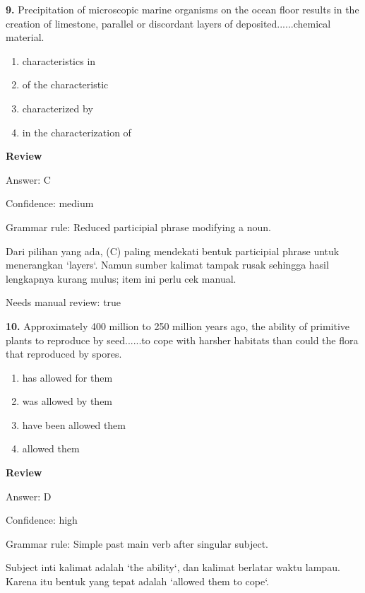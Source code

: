 \documentclass[12pt]{article}
\begin{document}
\noindent\textbf{9.} Precipitation of microscopic marine organisms on the ocean floor results in the creation of limestone, parallel or discordant layers of deposited......chemical material.
\begin{enumerate}[label=(\Alph*),leftmargin=*,itemsep=0.2em]
\item characteristics in
\item of the characteristic
\item characterized by
\item in the characterization of
\end{enumerate}
\par
\begingroup
\setlength{\parskip}{0pt}
\setlength{\parindent}{0pt}
\textbf{Review}\par
Answer: C\par
Confidence: medium\par
Grammar rule: Reduced participial phrase modifying a noun.\par
Dari pilihan yang ada, (C) paling mendekati bentuk participial phrase untuk menerangkan `layers`. Namun sumber kalimat tampak rusak sehingga hasil lengkapnya kurang mulus; item ini perlu cek manual.\par
Needs manual review: true\par
\endgroup
\par
\vspace{0.25\baselineskip}
\noindent\textbf{10.} Approximately 400 million to 250 million years ago, the ability of primitive plants to reproduce by seed......to cope with harsher habitats than could the flora that reproduced by spores.
\begin{enumerate}[label=(\Alph*),leftmargin=*,itemsep=0.2em]
\item has allowed for them
\item was allowed by them
\item have been allowed them
\item allowed them
\end{enumerate}
\par
\begingroup
\setlength{\parskip}{0pt}
\setlength{\parindent}{0pt}
\textbf{Review}\par
Answer: D\par
Confidence: high\par
Grammar rule: Simple past main verb after singular subject.\par
Subject inti kalimat adalah `the ability`, dan kalimat berlatar waktu lampau. Karena itu bentuk yang tepat adalah `allowed them to cope`.\par
\end{document}

